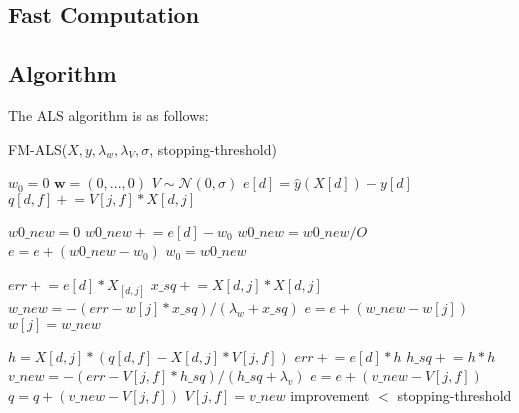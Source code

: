\documentclass[10pt]{journal}
\newcommand{\pluseq}{\mathrel{+}=}
\begin{document}
\subsection{Fast Computation}


\subsection{Algorithm}

The ALS algorithm is as follows:

\begin{algorithm}
\caption{FM-ALS($X, y, \lambda_w, \lambda_V, \sigma$, stopping-threshold)}
  \begin{algorithmic}[1]
    \State $w_0 = 0$  
    \State $\bm{w} = (0, ..., 0)$
    \State $V \sim \mathcal{N}(0, \sigma)$
      
        \State $e[d] = \hat{y}(X[d]) - y[d]$
                \State $q[d, f] \pluseq V[j,f] * X[d,j]$
            \EndFor
        \EndFor
    \EndFor
    \item[]
    \Repeat  {}
        \State $w0\_new = 0$  
            \State $w0\_new \pluseq e[d] - w_0$
        \EndFor
        \State $w0\_new = w0\_new / O$
        \State $e = e + (w0\_new - w_0)$
        \State $w_0 = w0\_new$
        \item[]
          
                \State $err \pluseq e[d] * X_[d,j]$
                \State $x\_sq \pluseq X[d,j] * X[d,j]$
            \EndFor
            \State $w\_new = - (err - w[j] * x\_sq) / (\lambda_w + x\_sq)$
            \State $e = e + (w\_new - w[j])$
            \State $w[j] = w\_new$
        \EndFor
        \item[]
          
                    \State $h = X[d,j] * (q[d,f] - X[d,j] * V[j,f])$
                    \State $err \pluseq e[d] * h$
                    \State $h\_sq \pluseq h * h$
                \EndFor
                \State $v\_new = - (err - V[j,f] * h\_sq) / (h\_sq + \lambda_v)$
                \State $e = e + (v\_new - V[j, f])$
                \State $q = q + (v\_new - V[j, f])$
                \State $V[j,f] = v\_new$
            \EndFor
        \EndFor
    \Until improvement $<$ stopping-threshold
  \end{algorithmic}
\end{algorithm}




\end{document}
